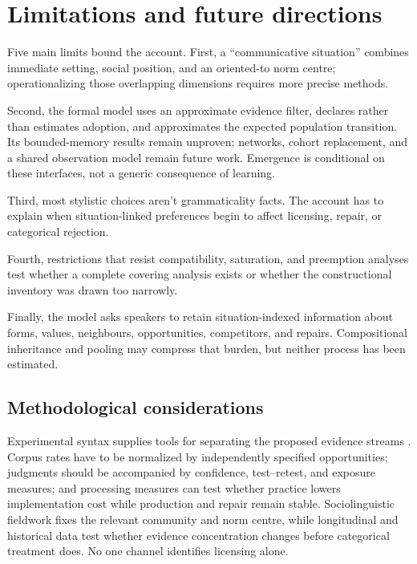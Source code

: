 \documentclass[12pt,letterpaper]{article}
\begin{document}
\section{Limitations and future directions}\label{sec:limitations}

Five main limits bound the account. First, a \enquote{communicative situation}
combines immediate setting, social position, and an oriented-to norm centre;
operationalizing those overlapping dimensions requires more precise methods.

Second, the formal model uses an approximate evidence filter, declares rather
than estimates adoption, and approximates the expected population transition.
Its bounded-memory results remain unproven; networks, cohort replacement, and a
shared observation model remain future work. Emergence is conditional on these
interfaces, not a generic consequence of learning.

Third, most stylistic choices aren't grammaticality facts. The account has to
explain when situation-linked preferences begin to affect licensing, repair, or
categorical rejection.

Fourth, restrictions that resist compatibility, saturation, and preemption
analyses test whether a complete covering analysis exists or whether the
constructional inventory was drawn too narrowly.

Finally, the model asks speakers to retain situation-indexed information about
forms, values, neighbours, opportunities, competitors, and repairs.
Compositional inheritance and pooling may compress that burden, but neither
process has been estimated.

\subsection{Methodological considerations}\label{sec:Methodological-Considerations}

Experimental syntax supplies tools for separating the proposed evidence streams
\autocite{schutze2016}. Corpus rates have to be normalized by independently
specified opportunities; judgments should be accompanied by confidence,
test--retest, and exposure measures; and processing measures can test whether
practice lowers implementation cost while production and repair remain stable.
Sociolinguistic fieldwork fixes the relevant community and norm centre, while
longitudinal and historical data test whether evidence concentration changes
before categorical treatment does. No one channel identifies licensing alone.
\end{document}

